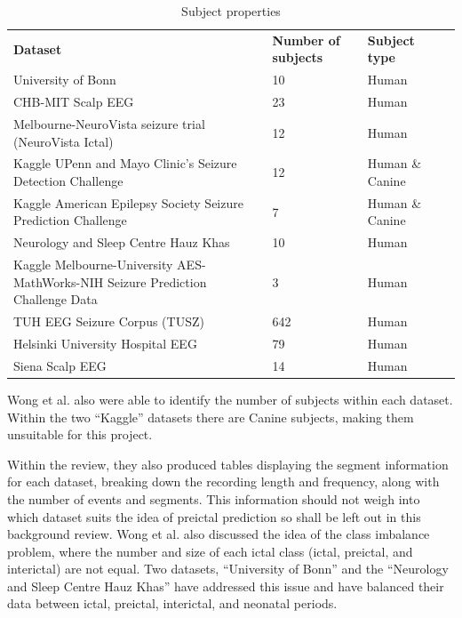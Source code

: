 \documentclass[12pt]{article}
\begin{document}
\begin{table}[H]
\centering
\begin{tabular}{p{}p{}p{}p{}}
\textbf{Dataset}                                                                & \textbf{Number of subjects} & \textbf{Subject type} & \textbf{} \\
University of Bonn                   & 10  & Human &  \\
CHB-MIT Scalp EEG                    & 23  & Human &  \\
Melbourne-NeuroVista seizure trial (NeuroVista Ictal)                           & 12                          & Human                 &           \\
Kaggle UPenn and Mayo Clinic's Seizure Detection Challenge                      & 12                          & Human \& Canine       &           \\
Kaggle American Epilepsy Society Seizure Prediction Challenge                   & 7                           & Human \& Canine       &           \\
Neurology and Sleep Centre Hauz Khas & 10  & Human &  \\
Kaggle Melbourne-University AES-MathWorks-NIH Seizure Prediction Challenge Data & 3                           & Human                 &           \\
TUH EEG Seizure Corpus (TUSZ)        & 642 & Human &  \\
Helsinki University Hospital EEG     & 79  & Human &  \\
Siena Scalp EEG                      & 14  & Human & 
\end{tabular}
\caption{Subject properties}
\end{table}

Wong et al. also were able to identify the number of subjects within each dataset. Within the two ``Kaggle'' datasets there are Canine subjects, making them unsuitable for this project. 

Within the review, they also produced tables displaying the segment information for each dataset, breaking down the recording length and frequency, along with the number of events and segments. This information should not weigh into which dataset suits the idea of preictal prediction so shall be left out in this background review. Wong et al. also discussed the idea of the class imbalance problem, where the number and size of each ictal class (ictal, preictal, and interictal) are not equal. Two datasets, ``University of Bonn'' and the ``Neurology and Sleep Centre Hauz Khas'' have addressed this issue and have balanced their data between ictal, preictal, interictal, and neonatal periods.
\end{document}
